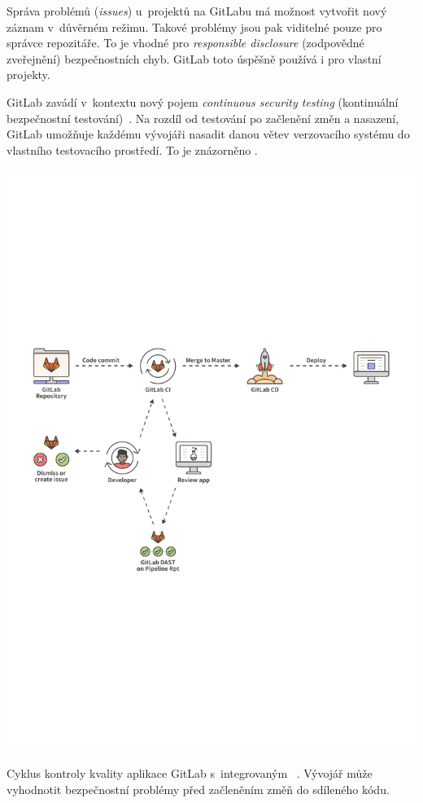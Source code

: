         Správa problémů (\textit{issues}) u~projektů na GitLabu má možnost vytvořit nový záznam v~důvěrném režimu. Takové problémy jsou pak viditelné pouze pro správce repozitáře. To je vhodné pro \textit{responsible disclosure} (zodpovědné zveřejnění) bezpečnostních chyb. GitLab toto úspěšně používá i pro vlastní projekty.

        GitLab zavádí v~kontextu \CICD nový pojem \textit{continuous security testing} (kontinuální bezpečnostní testování)~\cite{gitlab-app-security}. Na rozdíl od testování po začlenění změn a nasazení, GitLab umožňuje každému vývojáři nasadit danou větev verzovacího systému do vlastního testovacího prostředí. To je znázorněno .

        \begin{iffigure}
            \centering
            \includegraphics[width=\textwidth]{media/gitlab-review-cycle.pdf}
            \caption{Cyklus kontroly kvality aplikace GitLab s~integrovaným ~\cite{gitlab-app-security}. Vývojář může vyhodnotit bezpečnostní problémy před začleněním změň do sdíleného kódu.}
            \label{fig:gitlab-review-cycle}
        \end{iffigure}

